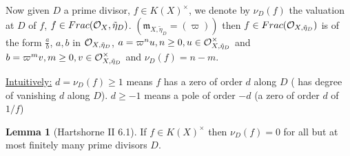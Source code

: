\documentclass[11pt]{article}
\theoremstyle{definition}
\newtheorem{lemma}[thm]{Lemma}
\newcommand{\scm}{{\mathfrak m}}
\newcommand{\calo}{{\cal O}}
\begin{document}
Now given $D$ a prime divisor, $f\in K(X)^{\times}$, we denote by $\nu_D(f)$ the valuation at $D$ of $f$, $f\in Frac(\calo_X,\tilde{\eta}_D)$. $(\scm_{X,\tilde{\eta}_D} =(\varpi))$ then $f\in Frac(\calo_{X,\tilde{\eta}_D})$ is of the form $\frac{a}{b}$, $a, b$ in $\calo_{X,\tilde{\eta}_D}$, 
$a=\varpi^n u, n\geq 0, u\in\calo_{X,\tilde{\eta}_D}^\times$ and $b=\varpi^m v, m \geq 0, v\in\calo_{X,\tilde{\eta}_D}^\times$ and $\nu_D(f)=n-m$.

\underline{Intuitively:}
$d=\nu_D(f)\geq 1$ means $f$ has a zero of order $d$ along $D$ ( has degree of vanishing $d$ along $D$). $d\geq -1$ means a pole of order $-d$ (a zero of order $d$ of $1/f$)



\begin{lemma}[Hartshorne II 6.1]\label{lem:Hartshorne II.6.1} If $f\in K(X)^\times$ then $\nu_D(f)=0$ for all but at most finitely many prime divisors $D$.
\end{lemma}
\end{document}
